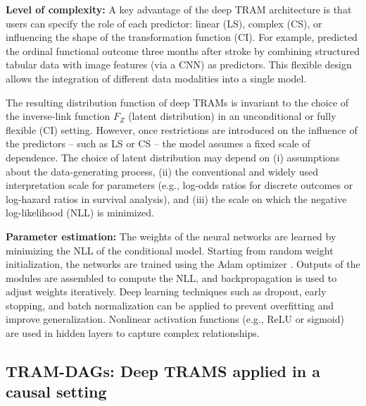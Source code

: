 \medskip

\textbf{Level of complexity:} A key advantage of the deep TRAM architecture is that users can specify the role of each predictor: linear (LS), complex (CS), or influencing the shape of the transformation function (CI). For example, \citet{herzog2023} predicted the ordinal functional outcome three months after stroke by combining structured tabular data with image features (via a CNN) as predictors. This flexible design allows the integration of different data modalities into a single model.


\medskip

The resulting distribution function of deep TRAMs is invariant to the choice of the inverse-link function $F_Z$ (latent distribution) in an unconditional \citep{hothorn2018} or fully flexible (CI) setting. However, once restrictions are introduced on the influence of the predictors -- such as LS or CS -- the model assumes a fixed scale of dependence. The choice of latent distribution may depend on (i) assumptions about the data-generating process, (ii) the conventional and widely used interpretation scale for parameters (e.g., log-odds ratios for discrete outcomes or log-hazard ratios in survival analysis), and (iii) the scale on which the negative log-likelihood (NLL) is minimized.

\medskip

\textbf{Parameter estimation:} The weights of the neural networks are learned by minimizing the NLL of the conditional model. Starting from random weight initialization, the networks are trained using the Adam optimizer \citep{kingma2015}. Outputs of the modules are assembled to compute the NLL, and backpropagation is used to adjust weights iteratively. Deep learning techniques such as dropout, early stopping, and batch normalization can be applied to prevent overfitting and improve generalization. Nonlinear activation functions (e.g., ReLU or sigmoid) are used in hidden layers to capture complex relationships.




\subsection{TRAM-DAGs: Deep TRAMS applied in a causal setting} \label{sec:tram_dags}



